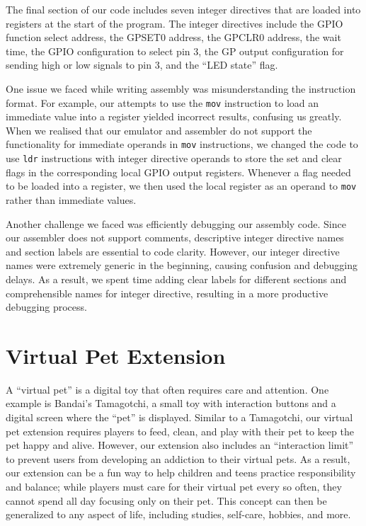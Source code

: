 \documentclass[11pt]{article}
\begin{document}
The final section of our code includes seven integer directives that are loaded 
into registers at the start of the program. The integer directives include the GPIO 
function select address, the GPSET0 address, the GPCLR0 address, the wait time, the 
GPIO configuration to select pin 3, the GP output configuration for sending 
high or low signals to pin 3, and the “LED state” flag.

One issue we faced while writing assembly was misunderstanding the instruction format. 
For example, our attempts to use the \texttt{mov} instruction to load an immediate 
value into a register yielded incorrect results, confusing us greatly. When we
realised that our emulator and assembler do not support the functionality for immediate 
operands in \texttt{mov} instructions, we changed the code to use 
\texttt{ldr} instructions with integer directive operands to store the set and 
clear flags in the corresponding local GPIO output registers. 
Whenever a flag needed to be loaded into a register, we then used the local register as 
an operand to \texttt{mov} rather than immediate values.

Another challenge we faced was efficiently debugging our assembly code. Since our assembler 
does not support comments, descriptive integer directive names and section labels are 
essential to code clarity. However, our integer directive names were extremely generic 
in the beginning, causing confusion and debugging delays. As a result, we spent 
time adding clear labels for different sections and comprehensible names for integer 
directive, resulting in a more productive debugging process. 

\section{Virtual Pet Extension}

A “virtual pet” is a digital toy that often requires care and attention. One 
example is Bandai's Tamagotchi, a small toy with interaction buttons 
and a digital screen where the “pet” is displayed. Similar to a Tamagotchi, our  
virtual pet extension requires players to feed, clean, and play with their pet to keep the 
pet happy and alive. However, our extension also includes an ``interaction limit'' 
to prevent users from developing an addiction to their virtual pets. As a result, our 
extension can be a fun way to help children and teens practice 
responsibility and balance; while players must care for their virtual 
pet every so often, they cannot spend all day focusing only  
on their pet. This concept can then be generalized to any aspect of life, including 
studies, self-care, hobbies, and more. 
\end{document}
